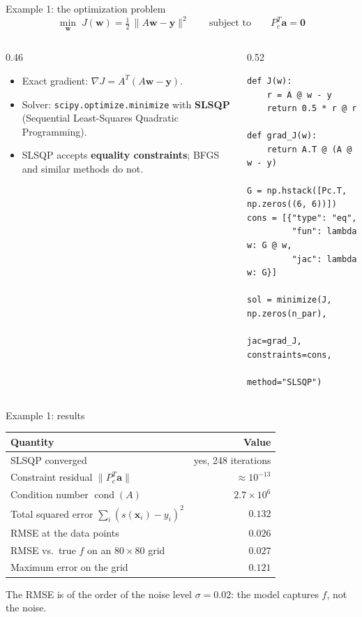 \documentclass[10pt,aspectratio=169]{beamer}
\newcommand{\hl}[1]{\textcolor{accent}{\textbf{#1}}}
\newcommand{\x}{\bm{x}}
\begin{document}
\begin{frame}[fragile]{Example 1: the optimization problem}
  \[
    \min_{\bm{w}}\; J(\bm{w}) = \tfrac12\,\lVert A\bm{w} - \bm{y}\rVert^2
    \qquad \text{subject to} \qquad P_c^T\bm{a} = \bm{0}
  \]
  \begin{columns}[T]
    \begin{column}{0.46\textwidth}
      \begin{itemize}
        \item Exact gradient:
              $\nabla J = A^T(A\bm{w} - \bm{y})$.
        \item Solver: \texttt{scipy.optimize.minimize} with \hl{SLSQP}
              (Sequential Least-Squares Quadratic Programming).
        \item SLSQP accepts \hl{equality constraints}; BFGS and similar
              methods do not.
      \end{itemize}
    \end{column}
    \begin{column}{0.52\textwidth}
\begin{lstlisting}
def J(w):
    r = A @ w - y
    return 0.5 * r @ r

def grad_J(w):
    return A.T @ (A @ w - y)

G = np.hstack([Pc.T, np.zeros((6, 6))])
cons = [{"type": "eq",
         "fun": lambda w: G @ w,
         "jac": lambda w: G}]

sol = minimize(J, np.zeros(n_par),
               jac=grad_J, constraints=cons,
               method="SLSQP")
\end{lstlisting}
    \end{column}
  \end{columns}
\end{frame}

\begin{frame}{Example 1: results}
  \centering
  \begin{tabular}{lr}
    \toprule
    Quantity & Value \\
    \midrule
    SLSQP converged & yes, 248 iterations \\
    Constraint residual $\lVert P_c^T\bm{a}\rVert$ & $\approx 10^{-13}$ \\
    Condition number $\operatorname{cond}(A)$ & $2.7\times 10^{6}$ \\
    \midrule
    Total squared error $\sum_i (s(\x_i)-y_i)^2$ & $0.132$ \\
    RMSE at the data points & $0.026$ \\
    RMSE vs.\ true $f$ on an $80\times80$ grid & $0.027$ \\
    Maximum error on the grid & $0.121$ \\
    \bottomrule
  \end{tabular}
  \vspace{1em}

  \small The RMSE is of the order of the noise level $\sigma = 0.02$:
  the model captures $f$, not the noise.
\end{frame}
\end{document}
